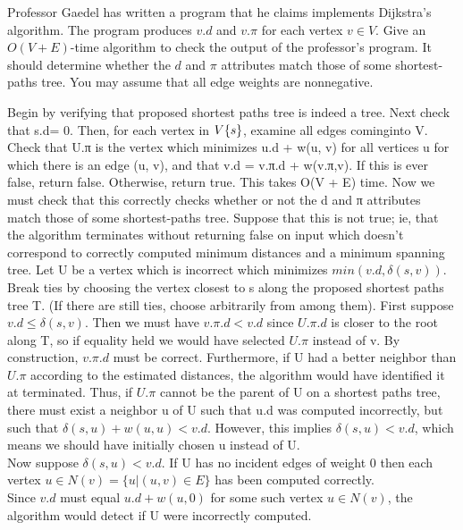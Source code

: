 \documentclass[a4paper, justified]{tufte-handout}
\begin{document}
\begin{problem}[TC 24.3-4]
Professor Gaedel has written a program that he claims implements Dijkstra's algorithm. The program produces $v.d$ and $v.\pi$ for each vertex $v \in V$. Give an $O(V + E)$-time algorithm to check the output of the professor's program. It should determine whether the $d$ and $\pi$ attributes match those of some shortest-paths tree. You may assume that all edge weights are nonnegative.
\end{problem}

\begin{solution}
	Begin by verifying that proposed shortest paths tree is indeed a tree. Next check that s.d= 0. Then, for each vertex in $V\\\{s\}$, examine all edges cominginto V. Check that U.π is the vertex which minimizes u.d + w(u, v) for all vertices u for which there is an edge (u, v), and that v.d = v.π.d + w(v.π,v). If this is ever false, return false. Otherwise, return true. This takes O(V + E) time. Now we must check that this correctly checks whether or not the d and π attributes match those of some shortest-paths tree. Suppose that this is not true; ie, that the algorithm terminates without returning false on input which doesn't correspond to correctly computed minimum distances and a minimum spanning tree. Let U be a vertex which is incorrect which minimizes $min(v.d, \delta(s, v))$.\\
	Break ties by choosing the vertex closest to s along the proposed shortest paths tree T. (If there are still ties, choose arbitrarily from among them).
	First suppose $v.d\leq \delta(s,v)$. Then we must have $v.\pi.d < v.d$ since $U.\pi.d$ is closer to the root along T, so if equality held we would have selected $U.\pi$ instead of v. By construction, $v.\pi.d$ must be correct. Furthermore, if U had a better neighbor than $U.\pi$ according to the estimated distances, the algorithm would have identified it at terminated. Thus, if $U.\pi$ cannot be the parent of U on a shortest paths tree, there must exist a neighbor u of U such that u.d was computed incorrectly, but such that $\delta(s,u) + w(u,u) < v.d$. However, this implies $\delta(s,u) < v.d$, which means we should have initially chosen u instead of U.\\
	Now suppose $\delta(s,u) < v.d$. If U has no incident edges of weight 0 then each vertex $u\in N(v) = \{u|(u,v) \in E\}$ has been computed correctly. \\
	Since $v.d$ must equal $u.d + w(u,0)$ for some such vertex $u\in N(v)$, the algorithm would detect if U were incorrectly computed. \\

\end{solution}
\end{document}
